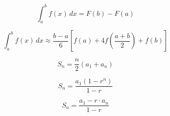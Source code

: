 \[\begin{equation} \int_a^b f(x) \, dx = F(b) - F(a) \end{equation}\]

\[\begin{equation} \int_a^b f(x) \, dx \approx \frac{b-a}{6} \left[ f(a) + 4f \left( \frac{a+b}{2} \right) + f(b) \right] \end{equation}\]

\[\begin{equation} \label{Arithmetic Sum for Finite} S_{n}=\frac{n}{2}(a_{1}+a_{n}) \end{equation}\]

\[\begin{equation} \label{Geometric Sum of a Finite} S_{n}=\frac{a_{1}(1-r^{n})}{1-r} \end{equation}\]

\[\begin{equation} \label{Geometric Sum of a Finite} S_{n}=\frac{a_{1}-r\cdot a_{n}}{1-r} \end{equation}\]

